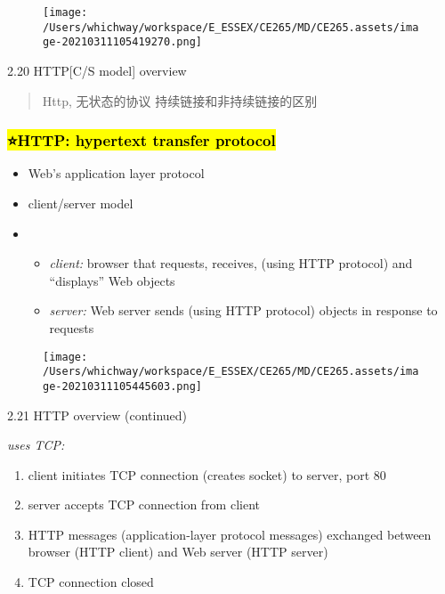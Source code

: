 \documentclass[
]{article}
\begin{document}
\begin{figure}
\centering
\texttt{[image: /Users/whichway/workspace/E\_ESSEX/CE265/MD/CE265.assets/image-20210311105419270.png]}
\caption{}
\end{figure}

2.20 HTTP{[}C/S model{]} overview

\begin{quote}
Http, 无状态的协议 持续链接和非持续链接的区别
\end{quote}

\hypertarget{http-hypertext-transfer-protocol}{%
\subsubsection{\texorpdfstring{\hl{⭐️HTTP: hypertext transfer
protocol}}{⭐️HTTP: hypertext transfer protocol}}\label{http-hypertext-transfer-protocol}}

\begin{itemize}
\item
  Web's application layer protocol
\item
  client/server model
\item
  \begin{itemize}
  \item
    \emph{client:} browser that requests, receives, (using HTTP
    protocol) and ``displays'' Web objects
  \item
    \emph{server:} Web server sends (using HTTP protocol) objects in
    response to requests
  \end{itemize}
\end{itemize}

\begin{figure}
\centering
\texttt{[image: /Users/whichway/workspace/E\_ESSEX/CE265/MD/CE265.assets/image-20210311105445603.png]}
\caption{}
\end{figure}

2.21 HTTP overview (continued)

\emph{uses TCP:}

\begin{enumerate}
\def\labelenumi{\arabic{enumi}.}
\item
  client initiates TCP connection (creates socket) to server, port 80
\item
  server accepts TCP connection from client
\item
  HTTP messages (application-layer protocol messages) exchanged between
  browser (HTTP client) and Web server (HTTP server)
\item
  TCP connection closed
\end{enumerate}
\end{document}
